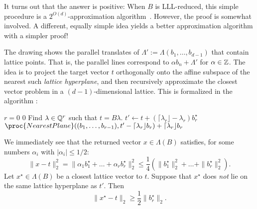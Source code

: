It turns out that the answer is positive:
When $B$ is LLL-reduced, this simple procedure is a $2^{O(d)}$-approximation algorithm~\cite{MR856638}.
However, the proof is somewhat involved.
A different, equally simple idea yields a better approximation algorithm with a simpler proof!
\begin{center}
\end{center}
The drawing shows the parallel translates of $\Lambda' := \Lambda(b_1,\ldots,b_{d-1})$
that contain lattice points.
That is, the parallel lines correspond to $\alpha b_n + \Lambda'$ for $\alpha \in \mathbb{Z}$.
The idea is to project the target vector $t$ orthogonally onto the affine subspace
of the nearest such \emph{lattice hyperplane},
and then recursively approximate the closest vector problem in a $(d-1)$-dimensional lattice.
This is formalized in the algorithm :
\begin{codebox}
  \li \If $r = 0$
  \li \Then \Return $0$
      \End
  \li Find $\lambda \in \mathbb{Q}^r$ such that $t = B \lambda$.
  \li $t' \gets t + (\lceil \lambda_r \rfloor - \lambda_r) b_r^\star$
  \li \Return $\proc{NearestPlane}((b_1,\ldots,b_{r-1}), t' - \lceil \lambda_r \rfloor b_r) + \lceil \lambda_r \rfloor b_r$
\end{codebox}
We immediately see that the returned vector $x \in \Lambda(B)$ satisfies,
for some numbers $\alpha_i$ with $|\alpha_i| \leq 1/2$:
\[
  \| x - t \|_2^2 = \|\alpha_1 b_1^\star + \dots + \alpha_r b_r^\star \|_2^2 \leq \frac{1}{4}(\|b_1^\star\|_2^2 + \dots + \|b_r^\star\|_2^2).
\]
Let $x^\star \in \Lambda(B)$ be a closest lattice vector to $t$.
Suppose that $x^\star$ does \emph{not} lie on the same lattice hyperplane as $t'$.
Then
\[
  \| x^\star - t \|_2 \geq \frac{1}{2} \|b_r^\star\|_2.
\]

